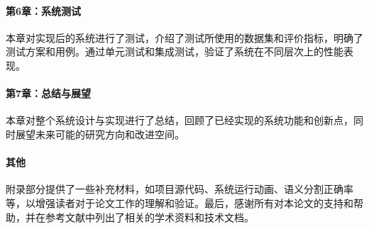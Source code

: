 \paragraph{第6章：系统测试}
\par 本章对实现后的系统进行了测试，介绍了测试所使用的数据集和评价指标，明确了测试方案和用例。通过单元测试和集成测试，验证了系统在不同层次上的性能表现。

\paragraph{第7章：总结与展望}
\par 本章对整个系统设计与实现进行了总结，回顾了已经实现的系统功能和创新点，同时展望未来可能的研究方向和改进空间。

\paragraph{其他}
\par 附录部分提供了一些补充材料，如项目源代码、系统运行动画、语义分割正确率等，以增强读者对于论文工作的理解和验证。最后，感谢所有对本论文的支持和帮助，并在参考文献中列出了相关的学术资料和技术文档。